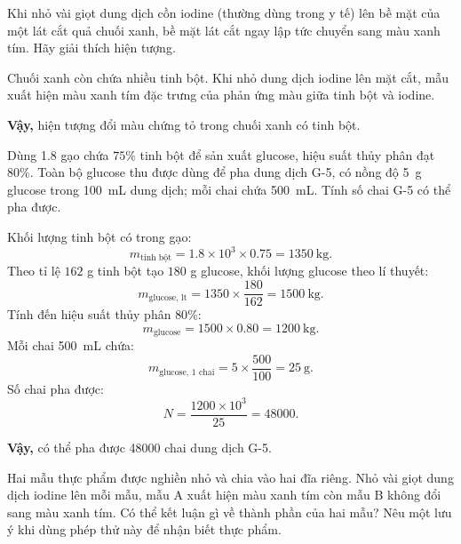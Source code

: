 \begin{tuluyen}
Khi nhỏ vài giọt dung dịch cồn iodine (thường dùng trong y tế) lên bề mặt của một lát cắt quả chuối xanh, bề mặt lát cắt ngay lập tức chuyển sang màu xanh tím. Hãy giải thích hiện tượng.
\begin{loigiaiBT}
Chuối xanh còn chứa nhiều tinh bột. Khi nhỏ dung dịch iodine lên mặt cắt, mẫu xuất hiện màu xanh tím đặc trưng của phản ứng màu giữa tinh bột và iodine.

\textbf{Vậy,} hiện tượng đổi màu chứng tỏ trong chuối xanh có tinh bột.
\end{loigiaiBT}
\end{tuluyen}

\begin{tuluyen}
Dùng \SI{1.8}{\ton} gạo chứa $75\%$ tinh bột để sản xuất glucose, hiệu suất thủy phân đạt $80\%$. Toàn bộ glucose thu được dùng để pha dung dịch G-5, có nồng độ \SI{5}{\gram} glucose trong \SI{100}{\milli\liter} dung dịch; mỗi chai chứa \SI{500}{\milli\liter}. Tính số chai G-5 có thể pha được.
\begin{loigiaiBT}
Khối lượng tinh bột có trong gạo:
\[
m_{\text{tinh bột}}=1.8\times10^3\times0.75
=\SI{1350}{\kilo\gram}.
\]
Theo tỉ lệ $162$ g tinh bột tạo $180$ g glucose, khối lượng glucose theo lí thuyết:
\[
m_{\text{glucose, lt}}=1350\times\frac{180}{162}
=\SI{1500}{\kilo\gram}.
\]
Tính đến hiệu suất thủy phân $80\%$:
\[
m_{\text{glucose}}=1500\times0.80
=\SI{1200}{\kilo\gram}.
\]
Mỗi chai \SI{500}{\milli\liter} chứa:
\[
m_{\text{glucose, 1 chai}}=5\times\frac{500}{100}
=\SI{25}{\gram}.
\]
Số chai pha được:
\[
N=\frac{1200\times10^3}{25}=48000.
\]

\textbf{Vậy,} có thể pha được 48000 chai dung dịch G-5.
\end{loigiaiBT}
\end{tuluyen}

\begin{tuluyen}
Hai mẫu thực phẩm được nghiền nhỏ và chia vào hai đĩa riêng. Nhỏ vài giọt dung dịch iodine lên mỗi mẫu, mẫu A xuất hiện màu xanh tím còn mẫu B không đổi sang màu xanh tím. Có thể kết luận gì về thành phần của hai mẫu? Nêu một lưu ý khi dùng phép thử này để nhận biết thực phẩm.
\end{tuluyen}

